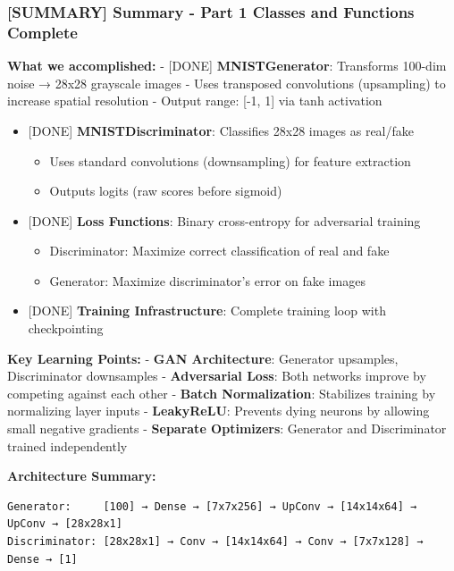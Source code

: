 \documentclass[11pt]{article}
\providecommand{\tightlist}{%
      \setlength{\itemsep}{0pt}\setlength{\parskip}{0pt}}
\begin{document}
    \subsubsection{{[}SUMMARY{]} Summary - Part 1 Classes and Functions
Complete}\label{summary-summary---part-1-classes-and-functions-complete}

\textbf{What we accomplished:} - {[}DONE{]} \textbf{MNISTGenerator}:
Transforms 100-dim noise → 28x28 grayscale images - Uses transposed
convolutions (upsampling) to increase spatial resolution - Output range:
{[}-1, 1{]} via tanh activation

\begin{itemize}
\tightlist
\item
  {[}DONE{]} \textbf{MNISTDiscriminator}: Classifies 28x28 images as
  real/fake

  \begin{itemize}
  \tightlist
  \item
    Uses standard convolutions (downsampling) for feature extraction
  \item
    Outputs logits (raw scores before sigmoid)
  \end{itemize}
\item
  {[}DONE{]} \textbf{Loss Functions}: Binary cross-entropy for
  adversarial training

  \begin{itemize}
  \tightlist
  \item
    Discriminator: Maximize correct classification of real and fake
  \item
    Generator: Maximize discriminator's error on fake images
  \end{itemize}
\item
  {[}DONE{]} \textbf{Training Infrastructure}: Complete training loop
  with checkpointing
\end{itemize}

\textbf{Key Learning Points:} - \textbf{GAN Architecture}: Generator
upsamples, Discriminator downsamples - \textbf{Adversarial Loss}: Both
networks improve by competing against each other - \textbf{Batch
Normalization}: Stabilizes training by normalizing layer inputs -
\textbf{LeakyReLU}: Prevents dying neurons by allowing small negative
gradients - \textbf{Separate Optimizers}: Generator and Discriminator
trained independently

\textbf{Architecture Summary:}

\begin{verbatim}
Generator:     [100] → Dense → [7x7x256] → UpConv → [14x14x64] → UpConv → [28x28x1]
Discriminator: [28x28x1] → Conv → [14x14x64] → Conv → [7x7x128] → Dense → [1]
\end{verbatim}
\end{document}
